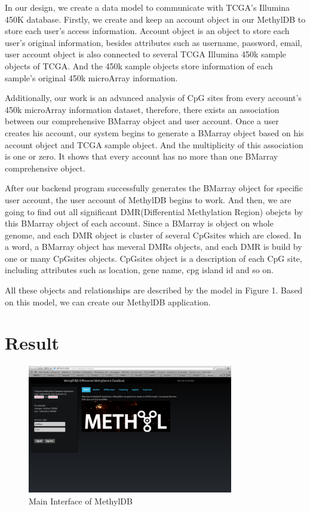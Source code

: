 \documentclass{article}\usepackage[]{graphicx}\usepackage[]{color}
\begin{document}
In our design, we create a data model to communicate with TCGA's Illumina 450K database. Firstly, we create and keep an account object in our MethylDB to store each user's access information. Account object is an object to store each user's original information, besides attributes such as username, password, email, user account object is also connected to several TCGA Illumina 450k sample objects of TCGA. And the 450k sample objects store information of each sample's original 450k microArray information. 

Additionally, our work is an advanced analysis of CpG sites from every account's 450k microArray information dataset, therefore, there exists an association between our comprehensive BMarray object and user account. Once a user creates his account, our system begins to generate a BMarray object based on his account object and TCGA sample object. And the multiplicity of this association is one or zero. It shows that every account has no more than one BMarray comprehensive object. 

After our backend program successfully generates the BMarray object for specific user account, the user account of MethylDB begins to work. And then, we are going to find out all significant DMR(Differential Methylation Region) obejcts by this BMarray object of each account. Since a BMarray is object on whole genome, and each DMR object is cluster of several CpGsites which are closed. In a word, a BMarray object has meveral DMRs objects, and each DMR is build by one or many CpGsites objects. CpGsites object is a description of each CpG site, including attributes such as location, gene name, cpg island id and so on.

All these objects and relationships are described by the model in Figure 1. Based on this model, we can create our MethylDB application.

\section{Result}

\begin{figure}
\centering
\includegraphics[width=0.8\textwidth]{MethylDB.png}
\caption{Main Interface of MethylDB}
\end{figure}
\end{document}
